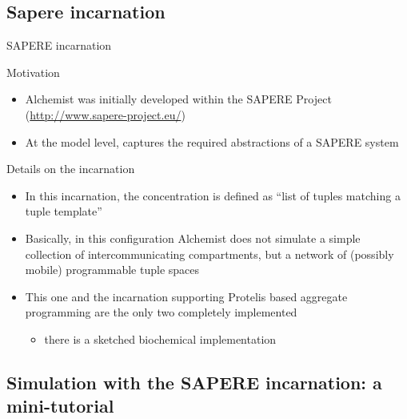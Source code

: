\documentclass[presentation]{beamer}
\begin{document}
\subsection{Sapere incarnation}
\begin{frame}{SAPERE incarnation}
 \begin{block}{Motivation}
  \begin{itemize}
   \item Alchemist was initially developed within the SAPERE Project (\url{http://www.sapere-project.eu/})
   \item At the model level, captures the required abstractions of a SAPERE system
  \end{itemize}
 \end{block}
 \begin{block}{Details on the incarnation}
  \begin{itemize}
   \item In this incarnation, the concentration is defined as ``list of tuples matching a tuple template''
   \item Basically, in this configuration Alchemist does not simulate a simple collection of intercommunicating compartments, but a network of (possibly mobile) programmable tuple spaces
   \item This one and the incarnation supporting Protelis based aggregate programming are the only two completely implemented
   \begin{itemize}
    \item there is a sketched biochemical implementation
   \end{itemize}
  \end{itemize}
 \end{block}
\end{frame}

\subsection{Simulation with the SAPERE incarnation: a mini-tutorial}
\end{document}
